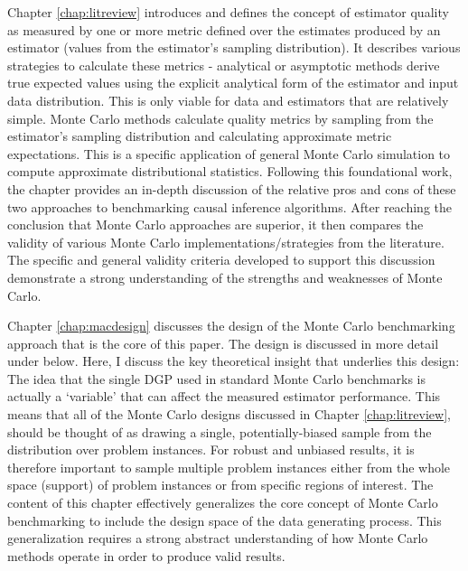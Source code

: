 \documentclass[../main.tex]{subfiles}
\begin{document}
Chapter \ref{chap:litreview} introduces and defines the concept of estimator quality as measured by one or more metric defined over the estimates produced by an estimator (values from the estimator's sampling distribution). It describes various strategies to calculate these metrics - analytical or asymptotic methods derive true expected values using the explicit analytical form of the estimator and input data distribution. This is only viable for data and estimators that are relatively simple. Monte Carlo methods calculate quality metrics by sampling from the estimator's sampling distribution and calculating approximate metric expectations. This is a specific application of general Monte Carlo simulation to compute approximate distributional statistics. Following this foundational work, the chapter provides an in-depth discussion of the relative pros and cons of these two approaches to benchmarking causal inference algorithms. After reaching the conclusion that Monte Carlo approaches are superior, it then compares the validity of various Monte Carlo implementations/strategies from the literature. The specific and general validity criteria developed to support this discussion demonstrate a strong understanding of the strengths and weaknesses of Monte Carlo.

\vspace{\baselineskip}

Chapter \ref{chap:macdesign} discusses the design of the Monte Carlo benchmarking approach that is the core of this paper. The design is discussed in more detail under  below. Here, I discuss the key theoretical insight that underlies this design: The idea that the single DGP used in standard Monte Carlo benchmarks is actually a `variable' that can affect the measured estimator performance. This means that all of the Monte Carlo designs discussed in Chapter \ref{chap:litreview}, should be thought of as drawing a single, potentially-biased sample from the distribution over problem instances. For robust and unbiased results, it is therefore important to sample multiple problem instances either from the whole space (support) of problem instances or from specific regions of interest. The content of this chapter effectively generalizes the core concept of Monte Carlo benchmarking to include the design space of the data generating process. This generalization requires a strong abstract understanding of how Monte Carlo methods operate in order to produce valid results.

\end{document}
